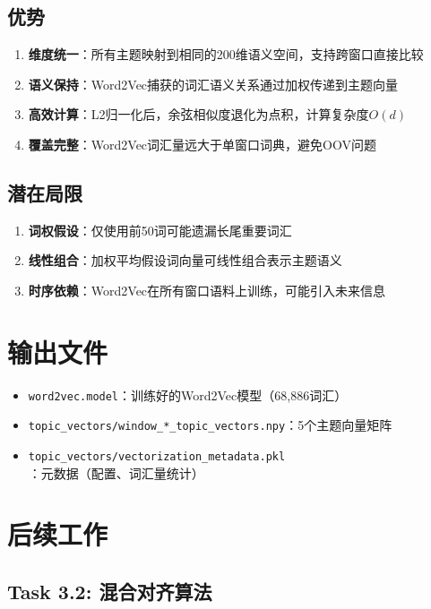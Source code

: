 \documentclass[11pt,a4paper]{article}
\begin{document}
\subsection{优势}

\begin{enumerate}
    \item \textbf{维度统一}：所有主题映射到相同的200维语义空间，支持跨窗口直接比较
    \item \textbf{语义保持}：Word2Vec捕获的词汇语义关系通过加权传递到主题向量
    \item \textbf{高效计算}：L2归一化后，余弦相似度退化为点积，计算复杂度$O(d)$
    \item \textbf{覆盖完整}：Word2Vec词汇量远大于单窗口词典，避免OOV问题
\end{enumerate}

\subsection{潜在局限}

\begin{enumerate}
    \item \textbf{词权假设}：仅使用前50词可能遗漏长尾重要词汇
    \item \textbf{线性组合}：加权平均假设词向量可线性组合表示主题语义
    \item \textbf{时序依赖}：Word2Vec在所有窗口语料上训练，可能引入未来信息
\end{enumerate}

\section{输出文件}

\begin{itemize}
    \item \texttt{word2vec.model}：训练好的Word2Vec模型（68,886词汇）
    \item \texttt{topic\_vectors/window\_*\_topic\_vectors.npy}：5个主题向量矩阵
    \item \texttt{topic\_vectors/vectorization\_metadata.pkl}：元数据（配置、词汇量统计）
\end{itemize}

\section{后续工作}

\subsection{Task 3.2: 混合对齐算法}
\end{document}
